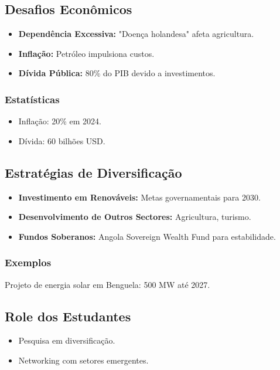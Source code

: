 \documentclass[12pt]{article}
\begin{document}
\subsection{Desafios Econômicos}
\begin{itemize}
    \item \textbf{Dependência Excessiva:} "Doença holandesa" afeta agricultura.
    \item \textbf{Inflação:} Petróleo impulsiona custos.
    \item \textbf{Dívida Pública:} 80\% do PIB devido a investimentos.
\end{itemize}

\subsubsection{Estatísticas}
\begin{itemize}
    \item Inflação: 20\% em 2024.
    \item Dívida: 60 bilhões USD.
\end{itemize}

\subsection{Estratégias de Diversificação}
\begin{itemize}
    \item \textbf{Investimento em Renováveis:} Metas governamentais para 2030.
    \item \textbf{Desenvolvimento de Outros Sectores:} Agricultura, turismo.
    \item \textbf{Fundos Soberanos:} Angola Sovereign Wealth Fund para estabilidade.
\end{itemize}

\subsubsection{Exemplos}
Projeto de energia solar em Benguela: 500 MW até 2027.

\subsection{Role dos Estudantes}
\begin{itemize}
    \item Pesquisa em diversificação.
    \item Networking com setores emergentes.
\end{itemize}
\end{document}
